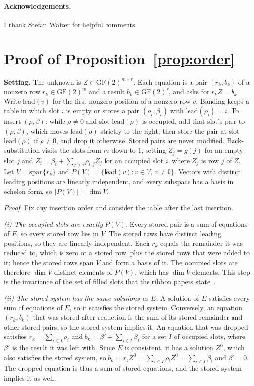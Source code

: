 \documentclass{article}
\begin{document}
\paragraph*{Acknowledgements.}
I thank Stefan Walzer for helpful comments.




\appendix
\section{Proof of Proposition~\ref{prop:order}}\label{app:proof}
\textbf{Setting.} The unknown is $Z\in\mathrm{GF}(2)^{m\times r}$. Each equation is a pair
$(r_k,b_k)$ of a nonzero row $r_k\in\mathrm{GF}(2)^m$ and a result $b_k\in\mathrm{GF}(2)^r$, and
asks for $r_kZ=b_k$. Write $\mathrm{lead}(v)$ for the first nonzero position of a nonzero row $v$.
Banding keeps a table in which slot $i$ is empty or stores a pair $(\rho_i,\beta_i)$ with
$\mathrm{lead}(\rho_i)=i$. To insert $(\rho,\beta)$: while $\rho\neq 0$ and slot
$\mathrm{lead}(\rho)$ is occupied, add that slot's pair to $(\rho,\beta)$, which moves
$\mathrm{lead}(\rho)$ strictly to the right; then store the pair at slot $\mathrm{lead}(\rho)$ if
$\rho\neq 0$, and drop it otherwise. Stored pairs are never modified. Back-substitution visits the
slots from $m$ down to $1$, setting $Z_j=g(j)$ for an empty slot $j$ and
$Z_i=\beta_i+\sum_{j>i}\rho_{i,j}Z_j$ for an occupied slot $i$, where $Z_j$ is row $j$ of $Z$.
Let $V=\mathrm{span}\{r_k\}$ and $P(V)=\{\mathrm{lead}(v) : v\in V,\ v\neq 0\}$. Vectors with
distinct leading positions are linearly independent, and every subspace has a basis in echelon
form, so $|P(V)|=\dim V$.

\emph{Proof.} Fix any insertion order and consider the table after the last insertion.

\emph{(i) The occupied slots are exactly $P(V)$.} Every stored pair is a sum of equations of $E$,
so every stored row lies in $V$. The stored rows have distinct leading positions, so they are
linearly independent. Each $r_k$ equals the remainder it was reduced to, which is zero or a stored
row, plus the stored rows that were added to it; hence the stored rows span $V$ and form a basis
of it. The occupied slots are therefore $\dim V$ distinct elements of $P(V)$, which has $\dim V$
elements. This step is the invariance of the set of filled slots that the ribbon papers
state~\citep{dillinger2021ribbon,dietzfelbinger2026ribbon}.

\emph{(ii) The stored system has the same solutions as $E$.} A solution of $E$ satisfies every sum
of equations of $E$, so it satisfies the stored system. Conversely, an equation $(r_k,b_k)$ that
was stored after reduction is the sum of its stored remainder and other stored pairs, so the
stored system implies it. An equation that was dropped satisfies $r_k=\sum_{i\in I}\rho_i$ and
$b_k=\beta'+\sum_{i\in I}\beta_i$ for a set $I$ of occupied slots, where $\beta'$ is the result it
was left with. Since $E$ is consistent, it has a solution $Z^0$, which also satisfies the stored
system, so $b_k=r_kZ^0=\sum_{i\in I}\rho_iZ^0=\sum_{i\in I}\beta_i$ and $\beta'=0$. The dropped
equation is thus a sum of stored equations, and the stored system implies it as well.
\end{document}
